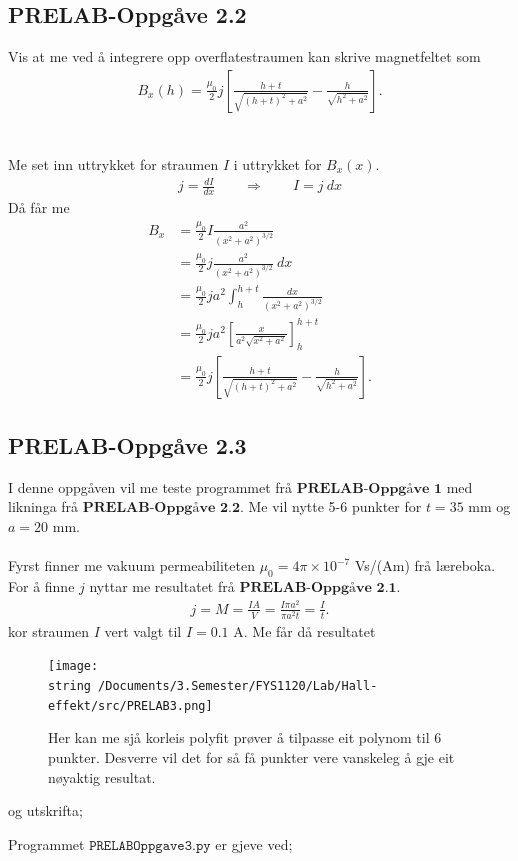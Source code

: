 \documentclass[11pt, a4paper]{article}
\begin{document}
  \subsection*{PRELAB-Oppgåve 2.2}
    Vis at me ved å integrere opp overflatestraumen kan skrive magnetfeltet som
    \begin{align*}
      B_x(h) = \frac{\mu_0}{2}j\left[ \frac{h + t}{\sqrt{(h + t)^2 + a^2}} - \frac{h}{\sqrt{h^2 + a^2}} \right].
    \end{align*} \\ \\
    Me set inn uttrykket for straumen $I$ i uttrykket for $B_x(x)$.
    \begin{align*}
      j = \frac{dI}{dx} \qquad \Rightarrow \qquad I = j\ dx
    \end{align*}
    Då får me 
    \begin{align*}
      B_x &= \frac{\mu_0}{2}I \frac{a^2}{(x^2 + a^2)^{3/2}} \\
      &= \frac{\mu_0}{2}j\frac{a^2}{(x^2 + a^2)^{3/2}}\ dx \\
      &= \frac{\mu_0}{2}ja^2\int_h^{h + t}\frac{dx}{(x^2 + a^2)^{3/2}} \\
      &= \frac{\mu_0}{2}ja^2\left[ \frac{x}{a^2\sqrt{x^2 + a^2}} \right]_h^{h + t} \\
      &= \frac{\mu_0}{2}j\left[ \frac{h + t}{\sqrt{(h + t)^2 + a^2}} - \frac{h}{\sqrt{h^2 + a^2}} \right].
    \end{align*}

  \subsection*{PRELAB-Oppgåve 2.3}
    I denne oppgåven vil me teste programmet frå $\textbf{PRELAB-Oppgåve 1}$ med likninga frå $\textbf{PRELAB-Oppgåve 2.2}$.
    Me vil nytte 5-6 punkter for $t = 35$ mm og $a = 20$ mm. \\ \\
    Fyrst finner me vakuum permeabiliteten $\mu_0 = 4\pi \times 10^{-7}$ Vs/(Am) frå læreboka. For å finne $j$ nyttar me resultatet frå $\textbf{PRELAB-Oppgåve 2.1}$.
    \begin{align*}
      j = M = \frac{IA}{V} = \frac{I\pi a^2}{\pi a^2t} = \frac{I}{t}.
    \end{align*}
    kor straumen $I$ vert valgt til $I = 0.1$ A. Me får då resultatet
    \begin{figure}[H]
      \centering
      \texttt{[image: \\string~/Documents/3.Semester/FYS1120/Lab/Hall-effekt/src/PRELAB3.png]}
      \caption{Her kan me sjå korleis polyfit prøver å tilpasse eit polynom til 6 punkter. Desverre vil det for så få punkter vere vanskeleg å gje eit nøyaktig resultat.}
    \end{figure}
    og utskrifta;
    
    Programmet $\texttt{PRELABOppgave3.py}$ er gjeve ved;
    
\end{document}
